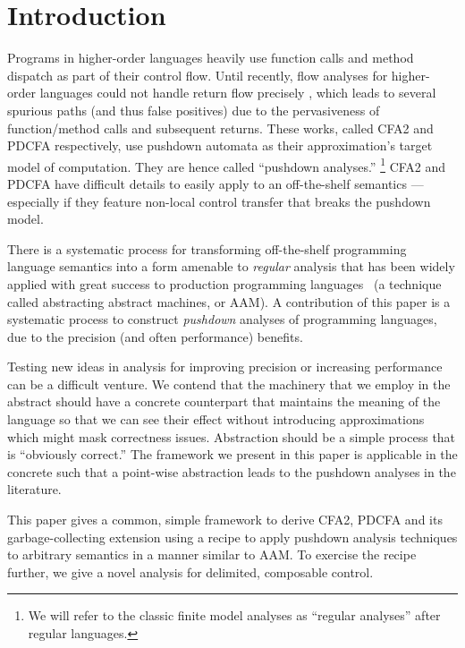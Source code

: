 \section{Introduction}

Programs in higher-order languages heavily use function calls and method dispatch as part of their control flow.
%
Until recently, flow analyses for higher-order languages could not handle return flow precisely \citep{ianjohnson:vardoulakis-lmcs11, ianjohnson:earl2010pdcfa}, which leads to several spurious paths (and thus false positives) due to the pervasiveness of function/method calls and subsequent returns.
%
These works, called CFA2 and PDCFA respectively, use pushdown automata as their approximation's target model of computation.
%
They are hence called ``pushdown analyses.''
%
\footnote{We will refer to the classic finite model analyses as ``regular analyses'' after regular languages.}
%
CFA2 and PDCFA have difficult details to easily apply to an off-the-shelf semantics --- especially if they feature non-local control transfer that breaks the pushdown model.

There is a systematic process for transforming off-the-shelf programming language semantics into a form amenable to \emph{regular} analysis that has been widely applied with great success to production programming languages~\citet{dvanhorn:VanHorn2010Abstracting} (a technique called abstracting abstract machines, or AAM).
%
A contribution of this paper is a systematic process to construct \emph{pushdown} analyses of programming languages, due to the precision (and often performance) benefits.

Testing new ideas in analysis for improving precision or increasing performance can be a difficult venture.
%
We contend that the machinery that we employ in the abstract should have a concrete counterpart that maintains the meaning of the language so that we can see their effect without introducing approximations which might mask correctness issues.
%
Abstraction should be a simple process that is ``obviously correct.''
%
The framework we present in this paper is applicable in the concrete such that a point-wise abstraction leads to the pushdown analyses in the literature.

This paper gives a common, simple framework to derive CFA2, PDCFA and its garbage-collecting extension using a recipe to apply pushdown analysis techniques to arbitrary semantics in a manner similar to AAM.
%
To exercise the recipe further, we give a novel analysis for delimited, composable control. \\

